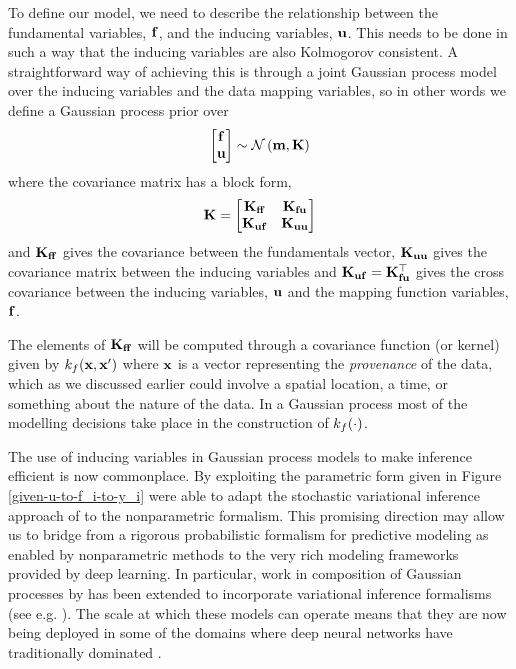 \documentclass[a4paperpaper,]{article}
\begin{document}
To define our model, we need to describe the relationship between the
fundamental variables, \(\mathbf{ f}\), and the inducing
variables, \(\mathbf{ u}\). This needs to be done in such a way that
the inducing variables are also Kolmogorov consistent. A straightforward
way of achieving this is through a joint Gaussian process model over the
inducing variables and the data mapping variables, so in other words we
define a Gaussian process prior over \[
\begin{bmatrix}
\mathbf{ f} \\ 
\mathbf{ u}
\end{bmatrix} \sim \mathcal{N}\left(\mathbf{m},\mathbf{K}\right)
\] where the covariance matrix has a block form, \[
\mathbf{K} = \begin{bmatrix} \mathbf{K}_{\mathbf{ f}\mathbf{ f}} & \mathbf{K}_{\mathbf{ f}\mathbf{ u}} \\ \mathbf{K}_{\mathbf{ u}\mathbf{ f}} & \mathbf{K}_{\mathbf{ u}\mathbf{ u}}\end{bmatrix}
\] and \(\kernelMatrix_{\mappingFunctionVector\mappingFunctionVector}\)
gives the covariance between the fundamentals vector,
\(\mathbf{K}_{\mathbf{ u}\mathbf{ u}}\) gives the covariance
matrix between the inducing variables and
\(\mathbf{K}_{\mathbf{ u}\mathbf{ f}} = \mathbf{K}_{\mathbf{ f}\mathbf{ u}}^\top\)
gives the cross covariance between the inducing variables,
\(\mathbf{ u}\) and the mapping function variables,
\(\mathbf{ f}\).

The elements of
\(\kernelMatrix_{\mappingFunctionVector\mappingFunctionVector}\) will be
computed through a covariance function (or kernel) given by
\(k_f(\mathbf{ x}, \mathbf{ x}^\prime)\)
where \(\mathbf{ x}\) is a vector representing the \emph{provenance} of
the data, which as we discussed earlier could involve a spatial
location, a time, or something about the nature of the data. In a
Gaussian process most of the modelling decisions take place in the
construction of \(k_f(\cdot)\).

The use of inducing variables in Gaussian process models to make inference efficient is now commonplace. By exploiting the parametric form given in Figure \ref{given-u-to-f_i-to-y_i} \citet{Hensman:bigdata13} were able to adapt the stochastic variational inference approach of \citet{Hoffman:stochastic12} to the nonparametric formalism. This promising direction may allow us to bridge from a rigorous probabilistic formalism for predictive modeling as enabled by nonparametric methods to the very rich modeling frameworks provided by deep learning. In particular, work in composition of Gaussian processes by \citet{Damianou:deepgp13} has been extended to incorporate variational inference formalisms (see e.g. \citet{Hensman:nested14,Dai:variationally16,Salimbeni:doubly2017}). The scale at which these models can operate means that they are now being deployed in some of the domains where deep neural networks have traditionally dominated \citep{Dutordoir-bayesian20}.
\end{document}
